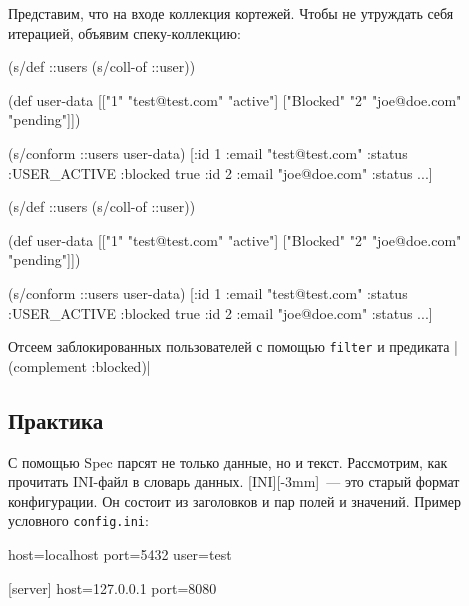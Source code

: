 Представим, что на входе коллекция кортежей. Чтобы не утруждать себя итерацией,
объявим спеку-коллекцию:

\ifx\DEVICETYPE\MOBILE

\begin{english}
  \begin{clojure}
(s/def ::users (s/coll-of ::user))

(def user-data
  [["1" "test@test.com" "active"]
   ["Blocked" "2" "joe@doe.com"
    "pending"]])

(s/conform ::users user-data)
[{:id 1
  :email "test@test.com"
  :status :USER_ACTIVE}
 {:blocked true
  :id 2
  :email "joe@doe.com"
  :status ...}]
  \end{clojure}
\end{english}

\else

\begin{english}
  \begin{clojure}
(s/def ::users (s/coll-of ::user))

(def user-data
  [["1" "test@test.com" "active"]
   ["Blocked" "2" "joe@doe.com" "pending"]])

(s/conform ::users user-data)
[{:id 1 :email "test@test.com" :status :USER_ACTIVE}
 {:blocked true :id 2 :email "joe@doe.com" :status ...}]
  \end{clojure}
\end{english}

\fi


Отсеем заблокированных пользователей с помощью \verb|filter| и предиката
\spverb|(complement :blocked)|

\subsection{Практика}


С помощью Spec парсят не только данные, но и текст. Рассмотрим, как прочитать
INI-файл в словарь данных. [INI][-3mm]~---
это старый формат конфигурации. Он состоит из заголовков и пар полей и
значений. Пример условного \verb|config.ini|:

\begin{english}
  \begin{ini}
[database]
host=localhost
port=5432
user=test

[server]
host=127.0.0.1
port=8080
  \end{ini}
\end{english}


